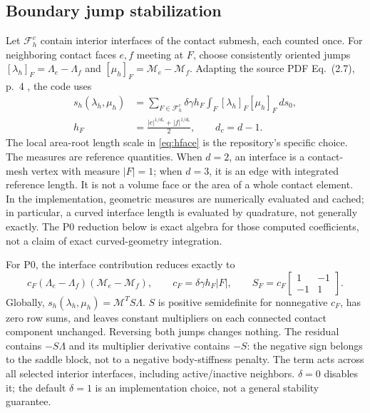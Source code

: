 \documentclass[preprint,11pt]{elsarticle}
\numberwithin{equation}{section}
\begin{document}
\subsection{Boundary jump stabilization}
Let $\mathcal F_h^c$ contain interior interfaces of the contact submesh,
each counted once. For neighboring contact faces $e,f$ meeting at $F$,
choose consistently oriented jumps
$[\lambda_h]_F=\Lambda_e-\Lambda_f$ and
$[\mu_h]_F=\mathcal M_e-\mathcal M_f$. Adapting the source PDF
Eq.~(2.7), p.~4 \cite{BHLv1}, the code uses
\begin{align}
 s_h(\lambda_h,\mu_h)
 &=\sum_{F\in\mathcal F_h^c}\delta\gamma h_F
        \int_F[\lambda_h]_F[\mu_h]_F\,ds_0,
 \label{eq:jump}\\
 h_F&=\frac{|e|^{1/d_c}+|f|^{1/d_c}}2,\qquad d_c=d-1.
 \label{eq:hface}
\end{align}
The local area-root length scale in \eqref{eq:hface} is the repository's
specific choice. The measures are reference quantities. When $d=2$, an
interface is a contact-mesh vertex with measure $|F|=1$; when $d=3$, it
is an edge with integrated reference length. It is not a volume face or
the area of a whole contact element.
In the implementation, geometric measures are numerically evaluated and
cached; in particular, a curved interface length is evaluated by quadrature,
not generally exactly. The P0 reduction below is exact algebra for those
computed coefficients, not a claim of exact curved-geometry integration.

For P0, the interface contribution reduces exactly to
\begin{equation}
 c_F(\Lambda_e-\Lambda_f)(\mathcal M_e-\mathcal M_f),\qquad
 c_F=\delta\gamma h_F|F|,\qquad
 S_F=c_F\begin{bmatrix}1&-1\\-1&1\end{bmatrix}.
 \label{eq:jumpmatrix}
\end{equation}
Globally, $s_h(\lambda_h,\mu_h)=\mathcal M^T S\Lambda$.
$S$ is positive semidefinite for nonnegative $c_F$, has zero row sums,
and leaves constant multipliers on each connected contact component
unchanged. Reversing both jumps changes nothing. The residual contains
$-S\Lambda$ and its multiplier derivative contains $-S$: the negative
sign belongs to the saddle block, not to a negative body-stiffness penalty.
The term acts across all selected interior interfaces, including
active/inactive neighbors. $\delta=0$ disables it; the default $\delta=1$
is an implementation choice, not a general stability guarantee.
\end{document}
